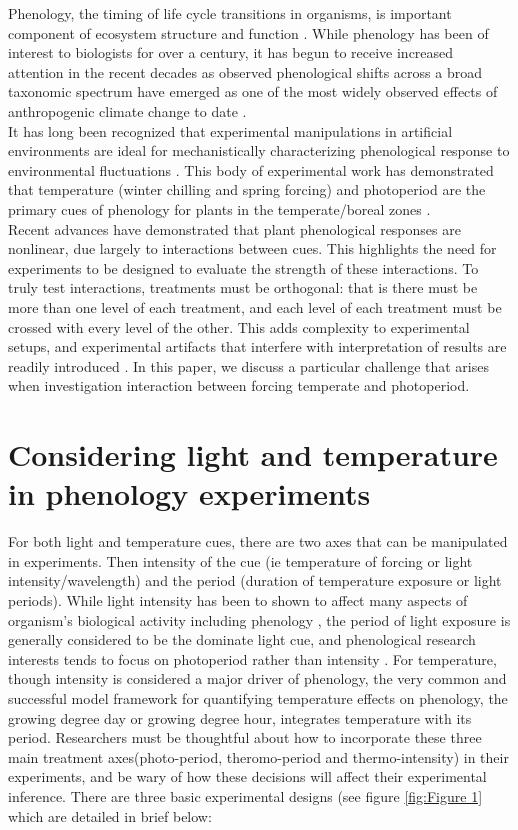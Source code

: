 \documentclass[12pt]{article}\usepackage[]{graphicx}\usepackage[]{color}
\begin{document}
 \indent \indent Phenology, the timing of life cycle transitions in organisms, is important component of ecosystem structure and function \citep{Chuine2001, Piao2007,Cleland2007}. While phenology has been of interest to biologists for over a century, it has begun to receive increased attention in the recent decades as observed phenological shifts across a broad taxonomic spectrum have emerged as one of the most widely observed effects of anthropogenic climate change to date \citep{Parmesan2003,Root2003,Menzel2006,Wolkovich2014}. \\
\indent It has long been recognized that experimental manipulations in artificial environments are ideal for mechanistically characterizing phenological response to environmental fluctuations \citep{Ettinger_inprep,Primack2015}. This body of experimental work has demonstrated that temperature (winter chilling and spring forcing) and photoperiod are the primary cues of phenology for plants in the temperate/boreal zones \citep{Rathcke1985,Visser2010,Forrest2010}.\\
\indent Recent advances have demonstrated that plant phenological responses are nonlinear, due largely to interactions between cues\citep{Flynn2018,Laube2014}. This highlights the need for experiments to be designed to evaluate the strength of these interactions. To truly test interactions, treatments must be orthogonal: that is there must be more than one level of each treatment, and each level of each treatment must be crossed with every level of the other. This adds complexity to experimental setups, and experimental artifacts that interfere with interpretation of results are readily introduced \citep{Wolkovich2012}. In this paper, we discuss a particular challenge that arises when investigation interaction between forcing temperate and photoperiod.

    \section*{Considering light and temperature in phenology experiments}
 \indent \indent  For both light and temperature cues, there are two axes that can be manipulated in experiments. Then intensity of the cue (ie temperature of forcing or light intensity/wavelength) and the period (duration of temperature exposure or light periods). While light intensity has been to shown to affect many aspects of organism's biological activity including phenology \citep{Brelsford2018,Cober1996}, the period of light exposure is generally considered to be the dominate light cue, and phenological research interests tends to focus on photoperiod rather than intensity \citep{findcitations}. For temperature, though intensity is considered a major driver of phenology, the very common and successful model framework for quantifying temperature effects on phenology, the growing degree day or growing degree hour, integrates temperature with its period. Researchers must be thoughtful about how to incorporate these three main treatment axes(photo-period, theromo-period and thermo-intensity) in their experiments, and be wary of how these decisions will affect their experimental inference. There are three basic experimental designs (see figure \ref{fig:Figure 1} which are detailed in brief below:
\end{document}
